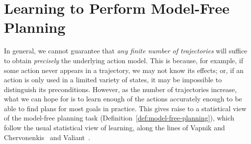 \documentclass[letterpaper]{article}
\begin{document}







\section{Learning to Perform Model-Free Planning}
In general, we cannot guarantee that {\em any finite number of trajectories} will suffice to obtain {\em precisely} the underlying action model. This is because, for example, if some action never appears in a trajectory, we may not know its effects; or, if an action is only used in a limited variety of states, it may be impossible to distinguish its preconditions. However, as the number of trajectories increase, what we can hope for is to learn enough of the actions accurately enough to be able to find plans for most goals in practice. This gives raise to a statistical view of the model-free planning task (Definition~\ref{def:model-free-planning}), which follow the usual statistical view of learning, along the lines of Vapnik and Chervonenkis~ and Valiant~.  %
\end{document}
